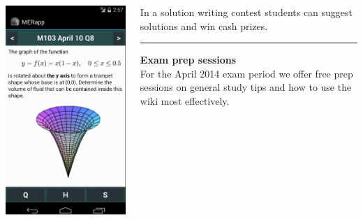 \documentclass{beamer}
\begin{document}
{\begin{columns}
\begin{column}{0.33\textwidth}
\begin{center}
\includegraphics[width=\textwidth]{app_screen.png}
\end{center}
\end{column}
\begin{column}{0.33\textwidth}

\vspace{-1.8cm}
In a solution writing contest students can suggest solutions and win cash prizes.

\bigskip
\hrule
\bigskip
{\bf \color{blue} Exam prep sessions}\\[.25cm]
For the April 2014 exam period we offer free prep sessions on general study tips and how to use the wiki most effectively.
\end{column}
\end{columns}
}
\end{document}

